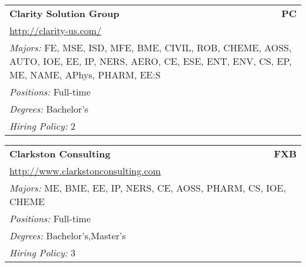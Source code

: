 \documentclass[twoside]{article}
\begin{document}
\begin{center}
\begin{multicols}{3}
\begin{FlushLeft}
\begin{minipage}{\columnwidth}
\end{minipage}
 
\begin{minipage}{\columnwidth}\begin{tabularx}{.95\columnwidth}{Xr}
                 {\Large\bf Clarity Solution Group} & {\Large\bf PC}\\
    \multicolumn{2}{p{.95\columnwidth}}{\url{http://clarity-us.com/}}\\
    \multicolumn{2}{p{.95\columnwidth}}{\emph{Majors:} FE, MSE, ISD, MFE, BME, CIVIL, ROB, CHEME, AOSS, AUTO, IOE, EE, IP, NERS, AERO, CE, ESE, ENT, ENV, CS, EP, ME, NAME, APhys, PHARM, EE:S}\\
    \multicolumn{2}{p{.95\columnwidth}}{\emph{Positions:} Full-time}\\
    \multicolumn{2}{p{.95\columnwidth}}{\emph{Degrees:} Bachelor's}\\
    \multicolumn{2}{p{.95\columnwidth}}{\emph{Hiring Policy:} 2}\\
    \end{tabularx}
    
\end{minipage}
 
\begin{minipage}{\columnwidth}\begin{tabularx}{.95\columnwidth}{Xr}
                 {\Large\bf Clarkston Consulting} & {\Large\bf FXB}\\
    \multicolumn{2}{p{.95\columnwidth}}{\url{http://www.clarkstonconsulting.com}}\\
    \multicolumn{2}{p{.95\columnwidth}}{\emph{Majors:} ME, BME, EE, IP, NERS, CE, AOSS, PHARM, CS, IOE, CHEME}\\
    \multicolumn{2}{p{.95\columnwidth}}{\emph{Positions:} Full-time}\\
    \multicolumn{2}{p{.95\columnwidth}}{\emph{Degrees:} Bachelor's,Master's}\\
    \multicolumn{2}{p{.95\columnwidth}}{\emph{Hiring Policy:} 3}\\
    \end{tabularx}
    
\end{minipage}
 

\end{FlushLeft}
\end{multicols}
\end{center}
\end{document}
